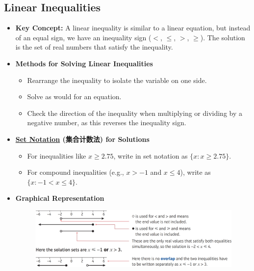 
\subsection{Linear Inequalities}
\begin{itemize}
    \item \textbf{Key Concept:} A linear inequality is similar to a linear equation, but instead of an equal sign, we have an
    inequality sign ($<$, $\leq$, $>$, $\geq$). The solution is the set of real numbers that satisfy the inequality.
    \item \textbf{Methods for Solving Linear Inequalities}
    \begin{itemize}
        \item Rearrange the inequality to isolate the variable on one side.
        \item Solve as would for an equation.
        \item Check the direction of the inequality when multiplying or dividing by a negative number, as this reverses the
        inequality sign.
    \end{itemize}
    \item \textbf{\underline{Set Notation} (集合计数法) for Solutions}
    \begin{itemize}
        \item For inequalities like $x \geq 2.75$, write in set notation as $\{x : x \geq 2.75\}$.
        \item For compound inequalities (e.g., $x > -1$ and $x \leq 4$), write as $\{x : -1 < x \leq 4\}$.
    \end{itemize}
    \item \textbf{Graphical Representation}
    \begin{figure}[H]
        \centering
        \includegraphics[scale=0.2]{Mathematics/Pure Mathematics/Ch3/Images/Ch3-4-1.png}
    \end{figure}
\end{itemize}